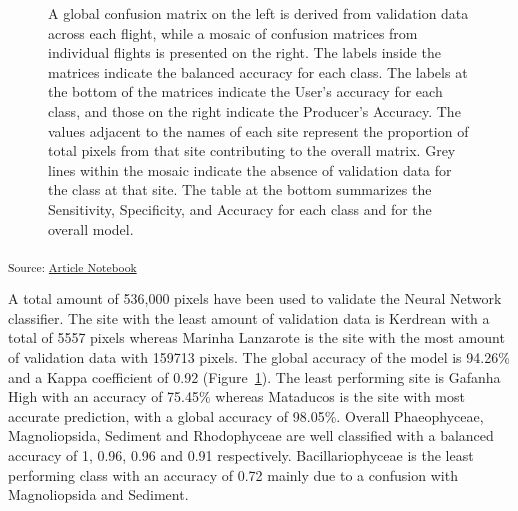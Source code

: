\documentclass[
  number]{elsarticle}
\begin{document}
\label{cell-fig-Validation}
\begin{figure}[H]


\caption{\label{fig-Validation}A global confusion matrix on the left is
derived from validation data across each flight, while a mosaic of
confusion matrices from individual flights is presented on the right.
The labels inside the matrices indicate the balanced accuracy for each
class. The labels at the bottom of the matrices indicate the User's
accuracy for each class, and those on the right indicate the Producer's
Accuracy. The values adjacent to the names of each site represent the
proportion of total pixels from that site contributing to the overall
matrix. Grey lines within the mosaic indicate the absence of validation
data for the class at that site. The table at the bottom summarizes the
Sensitivity, Specificity, and Accuracy for each class and for the
overall model.}

\end{figure}%

\textsubscript{Source:
\href{https://SigOiry.github.io/Drone_Paper_2023/index.qmd.html}{Article
Notebook}}

A total amount of 536,000 pixels have been used to validate the Neural
Network classifier. The site with the least amount of validation data is
Kerdrean with a total of 5557 pixels whereas Marinha Lanzarote is the
site with the most amount of validation data with 159713 pixels. The
global accuracy of the model is 94.26\% and a Kappa coefficient of 0.92
(Figure~\ref{fig-Validation}). The least performing site is Gafanha High
with an accuracy of 75.45\% whereas Mataducos is the site with most
accurate prediction, with a global accuracy of 98.05\%. Overall
Phaeophyceae, Magnoliopsida, Sediment and Rhodophyceae are well
classified with a balanced accuracy of 1, 0.96, 0.96 and 0.91
respectively. Bacillariophyceae is the least performing class with an
accuracy of 0.72 mainly due to a confusion with Magnoliopsida and
Sediment.
\end{document}
